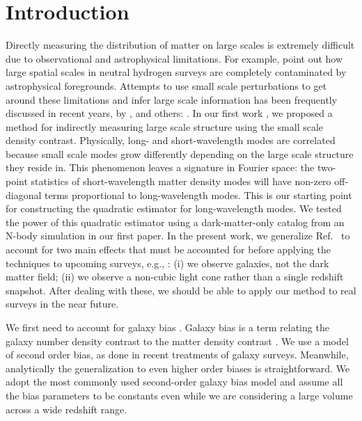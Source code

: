 \documentclass[prd,amsmath,amssymb,floatfix,superscriptaddress,nofootinbib,twocolumn]{revtex4-1}
\begin{document}
\section{Introduction} \label{sec1}
\noindent Directly measuring the distribution of matter on large
scales is extremely difficult due to observational and astrophysical
limitations.  For example,
\cite{Modi:2019hydr} point out how large spatial scales in neutral
hydrogen surveys are
completely contaminated by astrophysical foregrounds. Attempts
to use small scale perturbations to get around these limitations and
infer large scale information has been frequently discussed in recent
years, by \cite{Modi:2019hydr}, and others:
\cite{Baldauf:2011fer}\cite{Jeong:2012foss}\cite{Li:2014ssc}\cite{Zhu:2016tidal}\cite{Barreira:2017res}. In
our first work \cite{Li:2020fir}, we proposed a method for indirectly
measuring large scale structure using the small scale density
contrast. Physically, long- and short-wavelength modes are correlated
because small scale modes grow differently depending on the large
scale structure they reside in. This phenomenon leaves a signature in
Fourier space: the two-point statistics of short-wavelength matter
density modes will have non-zero off-diagonal terms proportional to
long-wavelength modes. This is our starting point for constructing the
quadratic estimator for long-wavelength modes. We tested the power of
this quadratic estimator using a dark-matter-only catalog from an
N-body simulation in our first paper. In the present work, we generalize
Ref.~\cite{Li:2020fir} to account for two main effects that must be
accounted for before applying the techniques to upcoming
surveys, e.g., \cite{LSST:2012ls}\cite{Wfirst:2012jg}\cite{DESI:2019ds}: (i)
we observe galaxies, not the dark matter field; (ii) we observe a
non-cubic light cone rather than a single redshift snapshot. After dealing
with these, we should
be able to apply our
method to real surveys in the near future.

We first need to account for galaxy bias
\cite{Kravtsov:1999hb}\cite{Desjacques:2018rev}. Galaxy bias is a term
relating the galaxy number density contrast to the matter density
contrast \cite{Gil-Marin:2014sta}\cite{Gil-Marin:2016wya}. We use a model of second order bias, as done in recent treatments of galaxy
surveys. Meanwhile, analytically the generalization to even higher
order biases is straightforward. We adopt the most commonly used
second-order galaxy bias model and assume all the bias parameters to
be constants even while we are considering a large volume across a wide
redshift range.
\end{document}
